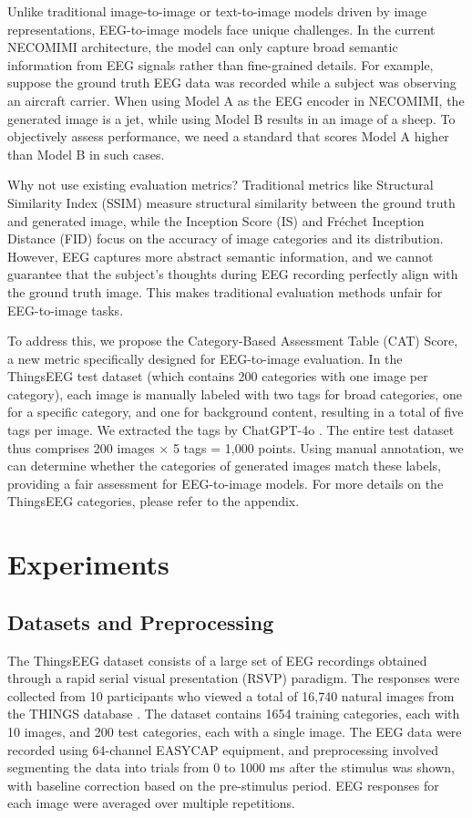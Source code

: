 \documentclass{article}
\begin{document}
Unlike traditional image-to-image or text-to-image models driven by image representations, EEG-to-image models face unique challenges. In the current NECOMIMI architecture, the model can only capture broad semantic information from EEG signals rather than fine-grained details. For example, suppose the ground truth EEG data was recorded while a subject was observing an aircraft carrier. When using Model A as the EEG encoder in NECOMIMI, the generated image is a jet, while using Model B results in an image of a sheep. To objectively assess performance, we need a standard that scores Model A higher than Model B in such cases.

Why not use existing evaluation metrics? Traditional metrics like Structural Similarity Index (SSIM) \cite{SSIM} measure structural similarity between the ground truth and generated image, while the Inception Score (IS) \cite{is_2016} and Fréchet Inception Distance (FID) \cite{NIPS2017_FID} focus on the accuracy of image categories and its distribution. However, EEG captures more abstract semantic information, and we cannot guarantee that the subject's thoughts during EEG recording perfectly align with the ground truth image. This makes traditional evaluation methods unfair for EEG-to-image tasks.

To address this, we propose the Category-Based Assessment Table (CAT) Score, a new metric specifically designed for EEG-to-image evaluation. In the ThingsEEG test dataset (which contains 200 categories with one image per category), each image is manually labeled with two tags for broad categories, one for a specific category, and one for background content, resulting in a total of five tags per image. We extracted the tags by ChatGPT-4o \cite{openai_2023}. The entire test dataset thus comprises 200 images × 5 tags = 1,000 points. Using manual annotation, we can determine whether the categories of generated images match these labels, providing a fair assessment for EEG-to-image models. For more details on the ThingsEEG categories, please refer to the appendix.


\section{Experiments}
\subsection{Datasets and Preprocessing}
The ThingsEEG dataset \cite{gifford2022large} consists of a large set of EEG recordings obtained through a rapid serial visual presentation (RSVP) paradigm. The responses were collected from 10 participants who viewed a total of 16,740 natural images from the THINGS database \cite{hebart2019things}. The dataset contains 1654 training categories, each with 10 images, and 200 test categories, each with a single image. The EEG data were recorded using 64-channel EASYCAP equipment, and preprocessing involved segmenting the data into trials from 0 to 1000 ms after the stimulus was shown, with baseline correction based on the pre-stimulus period. EEG responses for each image were averaged over multiple repetitions.
\end{document}
